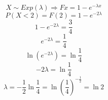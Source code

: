 \medskip
{}
\medskip
$$X \sim Exp(\lambda) \Rightarrow Fx=1-e^{-\lambda x}$$
$$P(X<2)=F(2)=1-e^{-2\lambda}$$
$$1-e^{-2\lambda}=\frac{3}{4}$$
$$e^{-2\lambda}=\frac{1}{4}$$
$$\ln(e^{-2\lambda})=\ln\frac{1}{4}$$
$$-2\lambda=\ln\frac{1}{4}$$
$$\lambda=-\frac{1}{2}\ln\frac{1}{4}=\ln(\frac{1}{4})^{-\frac{1}{2}}=\ln2$$

